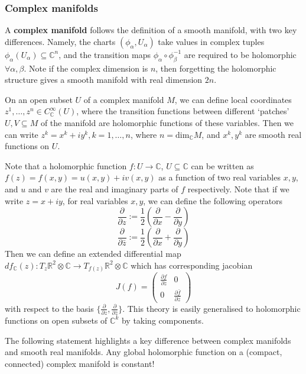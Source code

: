 \documentclass[a4paper]{article}
\theoremstyle{definition} \newtheorem*{definition}{Definition}
\theoremstyle{definition} \newtheorem*{definitions}{Definitions}
\theoremstyle{plain} \newtheorem{theorem}{Theorem}[section]
\theoremstyle{plain} \newtheorem{proposition}[theorem]{Proposition}
\theoremstyle{plain} \newtheorem{corollary}[theorem]{Corollary}
\theoremstyle{plain} \newtheorem{lemma}[theorem]{Lemma}
\theoremstyle{plain} \newtheorem{example}[theorem]{Example}
\newcommand{\defn}[1]{\textbf{#1}}
\newcommand{\realnos}{\mathbb{R}}
\newcommand{\complexnos}{\mathbb{C}}
\newcommand{\smooth}{C^\infty}
\begin{document}
\subsubsection{Complex manifolds}

A \defn{complex manifold} follows the definition of a smooth manifold, with two key differences. Namely, the charts $(\phi_\alpha, U_\alpha)$ take values in complex tuples $\phi_\alpha(U_\alpha)\subseteq \complexnos^n$, and the transition maps $\phi_\alpha\circ \phi_\beta^{-1}$ are required to be holomorphic $\forall \alpha, \beta$. Note if the complex dimension is $n$, then forgetting the holomorphic structure gives a smooth manifold with real dimension $2n$.

On an open subset $U$ of a complex manifold $M$, we can define local coordinates $z^1,\ldots, z^n\in \smooth_\complexnos (U)$, where the transition functions between different `patches' $U, V\subseteq M$ of the manifold are holomorphic functions of these variables. Then we can write $z^k=x^k+iy^k, k=1,\ldots, n$, where $n=\text{dim}_\complexnos M$, and $x^k, y^k$ are smooth real functions on $U$. 

Note that a holomorphic function $f:U\to \complexnos$, $U\subseteq \complexnos$ can be written as $f(z)=f(x, y)=u(x,y)+iv(x,y)$ as a function of two real variables $x, y$, and $u$ and $v$ are the real and imaginary parts of $f$ respectively. 
Note that if we write $z=x+iy$, for real variables $x, y$, we can define the following operators
$$\frac{\partial}{\partial z}:=\frac{1}{2} \left(\frac{\partial}{\partial x} - \frac{\partial}{\partial y}\right)$$
$$\frac{\partial}{\partial \bar{z}}:=\frac{1}{2} \left(\frac{\partial}{\partial x} + \frac{\partial}{\partial y}\right)$$
Then we can define an extended differential map $df_\complexnos(z):T_z \realnos^2 \otimes \complexnos \to T_{f(z)} \realnos^2\otimes \complexnos$ which has corresponding jacobian
$$J(f)=\begin{pmatrix}
    \frac{\partial f}{\partial z} & 0 \\
    0 &   \frac{\partial \bar{f}}{\partial \bar{z}}
\end{pmatrix}$$
with respect to the basis $\{ \frac{\partial }{\partial z},   \frac{\partial }{\partial \bar{z}} \}$. This theory is easily generalised to holomorphic functions on open subsets of $\complexnos^k$ by taking components. 

The following statement highlights a key difference between complex manifolds and smooth real manifolds. Any global holomorphic function on a (compact, connected) complex manifold is constant!
\end{document}
